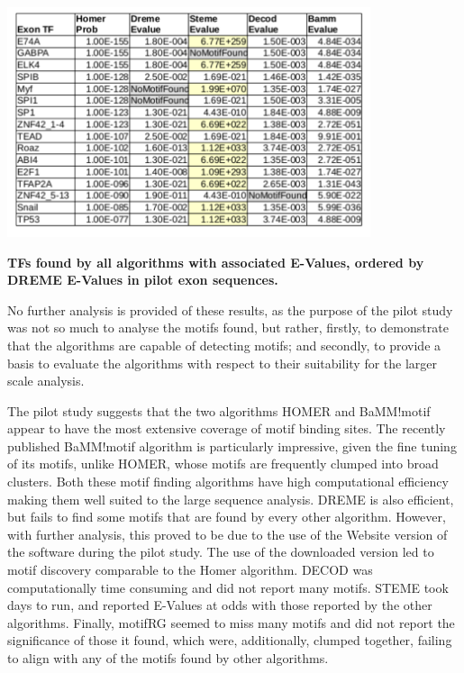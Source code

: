 \documentclass[12pt]{article}
\begin{document}
\begin{table}[!htbp]
\centering
\includegraphics[width=0.8\textwidth]{exonAllAlgorithmEValues.pdf} 
\caption{{\bf TFs found by all algorithms with associated E-Values, ordered by DREME E-Values in pilot exon sequences.}}\label{motif_evalue_summary_exons}
\end{table}

No further analysis is provided of these results, as the purpose of the pilot study was not so much to analyse the motifs found, but rather, firstly, to demonstrate that the algorithms are capable of detecting motifs; and secondly, to provide a basis to evaluate the algorithms with respect to their suitability for the larger scale analysis.

The pilot study suggests that the two algorithms HOMER and BaMM!motif appear to have the most extensive coverage of motif binding sites. The recently published BaMM!motif algorithm is particularly impressive, given the fine tuning of its motifs, unlike HOMER, whose motifs are frequently clumped into broad clusters. Both these motif finding algorithms have high computational efficiency making them well suited to the large sequence analysis. DREME is also 
efficient, but fails to find some motifs that are found by every other algorithm. However, with further analysis, this proved to be due to the use of the Website version of the software during the pilot study. The use of the downloaded version led to motif discovery comparable to the Homer algorithm. DECOD was computationally time consuming and did not report many motifs. STEME took days to run, and reported E-Values at odds with those reported by the other algorithms. Finally, motifRG seemed to miss many motifs and did not report the significance of those it found, which were, additionally, clumped together, failing to align with any of the motifs found by other algorithms. 
\end{document}
